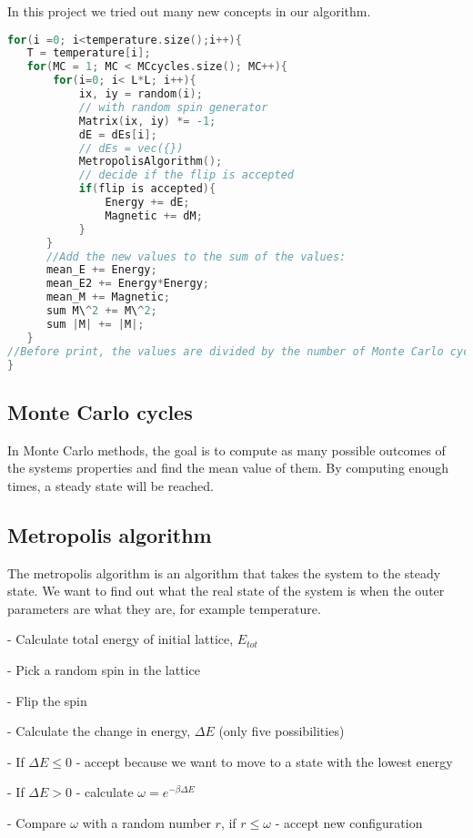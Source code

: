 In this project we tried out many new concepts in our algorithm.

\begin{lstlisting}[language=C++]
for(i =0; i<temperature.size();i++){
   T = temperature[i];
   for(MC = 1; MC < MCcycles.size(); MC++){
       for(i=0; i< L*L; i++){
           ix, iy = random(i);
           // with random spin generator        
           Matrix(ix, iy) *= -1;
           dE = dEs[i];
           // dEs = vec({})
           MetropolisAlgorithm();
           // decide if the flip is accepted
           if(flip is accepted){
               Energy += dE;
               Magnetic += dM;
           }
      }
      //Add the new values to the sum of the values:
      mean_E += Energy;
      mean_E2 += Energy*Energy;
      mean_M += Magnetic;
      sum M\^2 += M\^2;
      sum |M| += |M|;
   }
//Before print, the values are divided by the number of Monte Carlo cycles to find the mean values.
}
\end{lstlisting}


\subsection{Monte Carlo cycles}

In Monte Carlo methods, the goal is to compute as many possible outcomes of the systems properties and find the mean value of them. By computing enough times, a steady state will be reached.


\subsection{Metropolis algorithm}

The metropolis algorithm is an algorithm that takes the system to the steady state. We want to find out what the real state of the system is when the outer parameters are what they are, for example temperature.

- Calculate total energy of initial lattice, $E_{tot}$

- Pick a random spin in the lattice

- Flip the spin

- Calculate the change in energy, $\Delta E$ (only five possibilities)

- If $\Delta E \leq 0$ - accept because we want to move to a state with the lowest energy

- If $\Delta E > 0$ - calculate $\omega = e^{-\beta \Delta E}$

- Compare $\omega$ with a random number $r$, if $r \leq \omega$ - accept new configuration

